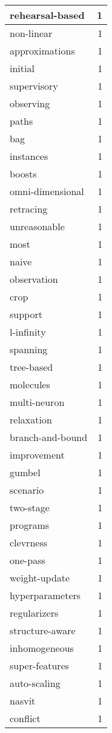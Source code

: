 \begin{table}[h]
\begin{tabular}{|l|r|}
\hline
rehearsal-based & 1 \\
\hline
non-linear & 1 \\
\hline
approximations & 1 \\
\hline
initial & 1 \\
\hline
supervisory & 1 \\
\hline
observing & 1 \\
\hline
paths & 1 \\
\hline
bag & 1 \\
\hline
instances & 1 \\
\hline
boosts & 1 \\
\hline
omni-dimensional & 1 \\
\hline
retracing & 1 \\
\hline
unreasonable & 1 \\
\hline
most & 1 \\
\hline
naive & 1 \\
\hline
observation & 1 \\
\hline
crop & 1 \\
\hline
support & 1 \\
\hline
l-infinity & 1 \\
\hline
spanning & 1 \\
\hline
tree-based & 1 \\
\hline
molecules & 1 \\
\hline
multi-neuron & 1 \\
\hline
relaxation & 1 \\
\hline
branch-and-bound & 1 \\
\hline
improvement & 1 \\
\hline
gumbel & 1 \\
\hline
scenario & 1 \\
\hline
two-stage & 1 \\
\hline
programs & 1 \\
\hline
clevrness & 1 \\
\hline
one-pass & 1 \\
\hline
weight-update & 1 \\
\hline
hyperparameters & 1 \\
\hline
regularizers & 1 \\
\hline
structure-aware & 1 \\
\hline
inhomogeneous & 1 \\
\hline
super-features & 1 \\
\hline
auto-scaling & 1 \\
\hline
nasvit & 1 \\
\hline
conflict & 1 \\

\end{tabular}
\end{table}
